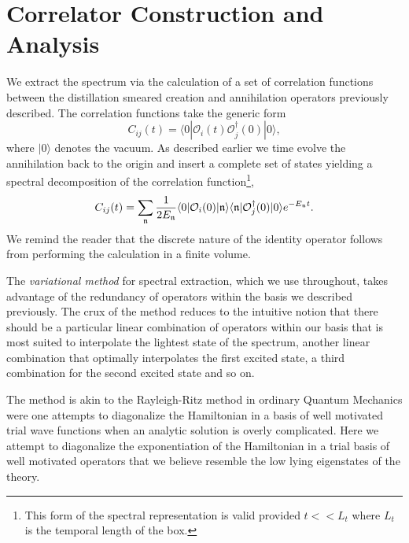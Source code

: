 
\section{Correlator Construction and Analysis} \label{sec::Spec:corrConstruct}
We extract the spectrum via the calculation of a set of correlation functions between the distillation smeared creation and annihilation operators previously described. The correlation functions take the generic form 
\begin{equation*}
C_{ij}(t) = \langle 0 | \mathcal{O}_i(t) \mathcal{O}_j^\dagger(0) | 0 \rangle, 
\end{equation*}
where $|0\rangle$ denotes the vacuum. As described earlier we time evolve the annihilation back to the origin and insert a complete set of states yielding a spectral decomposition of the correlation function\footnote{This form of the spectral representation is valid provided $t << L_t$ where $L_t$ is the temporal length of the box. },
\begin{equation}
C_{ij}(t) = \sum_{\mathfrak{n}} \frac{1}{2E_{\mathfrak{n}}} \langle 0 | \mathcal{O}_i(0) | \mathfrak{n} \rangle \langle \mathfrak{n} | \mathcal{O}_j^\dagger(0) | 0 \rangle e^{-E_{\mathfrak{n}}t} \label{eqn::spec_rep_1}.
\end{equation}
We remind the reader that the discrete nature of the identity operator follows from performing the calculation in a finite volume. 

The \emph{variational method} for spectral extraction, which we use throughout, takes advantage of the redundancy of operators within the basis we described previously. The crux of the method reduces to the intuitive notion that there should be a particular linear combination of operators within our basis that is most suited to interpolate the lightest state of the spectrum, another linear combination that optimally interpolates the first excited state, a third combination for the second excited state and so on. 

The method is akin to the Rayleigh-Ritz method in ordinary Quantum Mechanics were one attempts to diagonalize the Hamiltonian in a basis of well motivated trial wave functions when an analytic solution is overly complicated. Here we attempt to diagonalize the exponentiation of the Hamiltonian in a trial basis of well motivated operators that we believe resemble the low lying eigenstates of the theory. 

